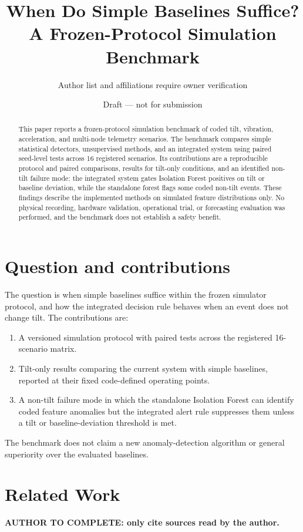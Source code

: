 \documentclass[11pt]{article}
\title{When Do Simple Baselines Suffice?\\
\large A Frozen-Protocol Simulation Benchmark}
\author{Author list and affiliations require owner verification}
\date{Draft --- not for submission}
\begin{document}
\maketitle

\begin{abstract}
This paper reports a frozen-protocol simulation benchmark of coded tilt,
vibration, acceleration, and multi-node telemetry scenarios. The benchmark
compares simple statistical detectors, unsupervised methods, and an integrated
system using paired seed-level tests across 16 registered scenarios. Its
contributions are a reproducible protocol and paired comparisons, results for
tilt-only conditions, and an identified non-tilt failure mode: the integrated
system gates Isolation Forest positives on tilt or baseline deviation, while
the standalone forest flags some coded non-tilt events. These findings describe
the implemented methods on simulated feature distributions only. No physical
recording, hardware validation, operational trial, or forecasting evaluation
was performed, and the benchmark does not establish a safety benefit.
\end{abstract}

\section{Question and contributions}
The question is when simple baselines suffice within the frozen simulator
protocol, and how the integrated decision rule behaves when an event does not
change tilt. The contributions are:
\begin{enumerate}
  \item A versioned simulation protocol with paired tests across the registered
  16-scenario matrix.
  \item Tilt-only results comparing the current system with simple baselines,
  reported at their fixed code-defined operating points.
  \item A non-tilt failure mode in which the standalone Isolation Forest can
  identify coded feature anomalies but the integrated alert rule suppresses
  them unless a tilt or baseline-deviation threshold is met.
\end{enumerate}
The benchmark does not claim a new anomaly-detection algorithm or general
superiority over the evaluated baselines.

\section{Related Work}
\textbf{AUTHOR TO COMPLETE: only cite sources read by the author.}
\end{document}
